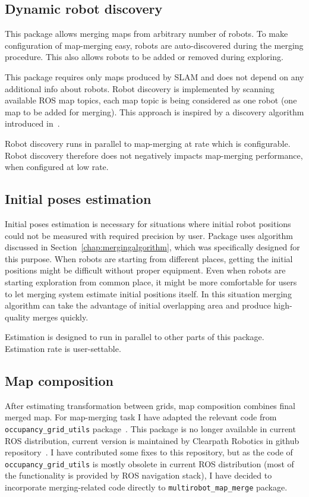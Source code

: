 \subsection{Dynamic robot discovery}

This package allows merging maps from arbitrary number of robots. To make configuration of map-merging easy, robots are auto-discovered during the merging procedure. This also allows robots to be added or removed during exploring.

This package requires only maps produced by \gls{SLAM} and does not depend on any additional info about robots. Robot discovery is implemented by scanning available \gls{ROS} map topics, each map topic is being considered as one robot (one map to be added for merging). This approach is inspired by a discovery algorithm introduced in~\cite{Yan2014}.

Robot discovery runs in parallel to map-merging at rate which is configurable. Robot discovery therefore does not negatively impacts map-merging performance, when configured at low rate.

\subsection{Initial poses estimation}

Initial poses estimation is necessary for situations where initial robot positions could not be measured with required precision by user. Package uses algorithm discussed in Section~\ref{chap:mergingalgorithm}, which was specifically designed for this purpose. When robots are starting from different places, getting the initial positions might be difficult without proper equipment. Even when robots are starting exploration from common place, it might be more comfortable for users to let merging system estimate initial positions itself. In this situation merging algorithm can take the advantage of initial overlapping area and produce high-quality merges quickly.

Estimation is designed to run in parallel to other parts of this package. Estimation rate is user-settable.

\subsection{Map composition}
\label{sec:map-composition}

After estimating transformation between grids, map composition combines final merged map. For map-merging task I have adapted the relevant code from \texttt{occu\-pan\-cy\_grid\_uti\-ls} package~\cite{Marthi2014}. This package is no longer available in current \gls{ROS} distribution, current version is maintained by Clearpath Robotics in github repository~\cite{GitHubOccGridUtils}. I have contributed some fixes to this repository, but as the code of \texttt{occu\-pan\-cy\_grid\_uti\-ls} is mostly obsolete in current \gls{ROS} distribution (most of the functionality is provided by \gls{ROS} navigation stack), I have decided to incorporate merging-related code directly to \texttt{multi\-robot\_map\_merge} package.

